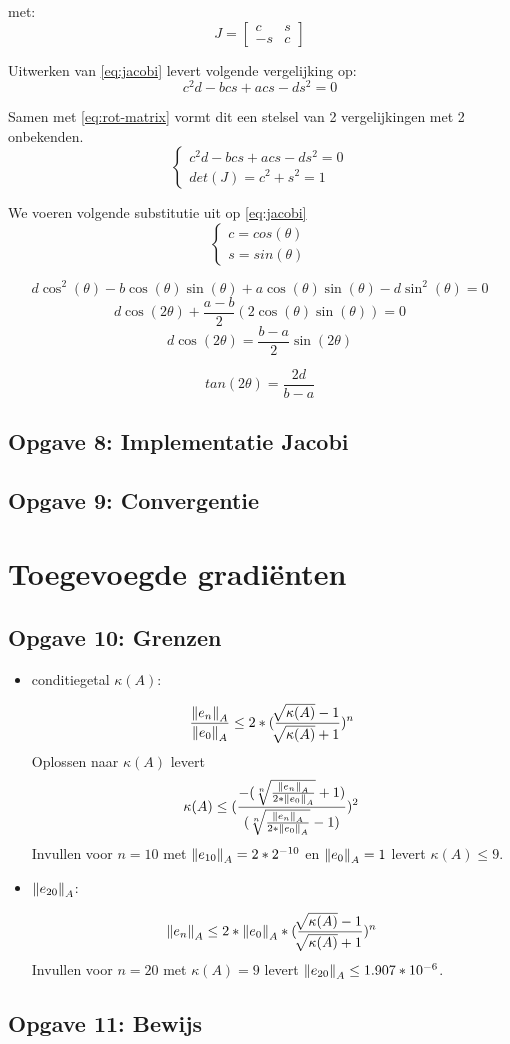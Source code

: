 \documentclass[a4paper]{article}
\newcommand{\opgave}[1]{\subsection{Opgave #1}}
\begin{document}
met: $$J = \begin{bmatrix}
c & s \\ -s & c
\end{bmatrix}$$

Uitwerken van \ref{eq:jacobi} levert volgende vergelijking op:
\begin{equation}
c^2d-bcs+acs-ds^2 = 0
\end{equation}

Samen met \ref{eq:rot-matrix} vormt dit een stelsel van 2 vergelijkingen met 2 onbekenden.
$$\begin{cases}
c^2d-bcs+acs-ds^2 = 0 \\ det(J) = c^2 + s^2 = 1
\end{cases}$$

We voeren volgende substitutie uit op \ref{eq:jacobi}
\begin{equation}
\begin{cases}
c = cos(\theta) \\ s = sin(\theta)
\end{cases}
\end{equation}

$$ d \cos^2(\theta) - b \cos(\theta) \sin(\theta) + a \cos(\theta) \sin(\theta) - d \sin^2(\theta) = 0$$
$$ d \cos(2\theta) + \frac{a-b}{2}(2 \cos(\theta)\sin(\theta)) = 0 $$
$$ d \cos(2\theta) = \frac{b-a}{2}\sin(2\theta)$$

\begin{equation}
tan(2\theta) = \frac{2d}{b-a}
\end{equation}

\opgave{8: Implementatie Jacobi}\label{sec:oef8}

\opgave{9: Convergentie}\label{sec:oef9}

\section{Toegevoegde gradi\"enten}\label{sec:CG}

\opgave{10: Grenzen}\label{sec:oef10}

\begin{itemize}
    	\item conditiegetal \(\kappa(A)\): \par\noindent
        \[\frac{\norm{e_n}_A}{\norm{e_0}_A} \leq 2*(\frac{\sqrt[]{\kappa(A)}-1}{\sqrt[]					{\kappa(A)}+1})^n\]
        Oplossen naar \(\kappa(A)\) levert
        \[\kappa(A) \leq (\frac{-(\sqrt[n]{\frac{\norm{e_n}_A}{2*\norm{e_0}_A}}+1)}						{(\sqrt[n]{\frac{\norm{e_n}_A}{2*\norm{e_0}_A}}-1)})^2\]
        Invullen voor \(n = 10\) met \(\norm{e_{10}}_A = 2*2^{-10}\) en \(\norm{e_0}_A = 1\) 			levert \(\kappa(A) \leq 9\).
        
        \item \(\norm{e_{20}}_A\): \par\noindent
        \[\norm{e_n}_A \leq 2*\norm{e_0}_A*(\frac{\sqrt[]{\kappa(A)}-1}{\sqrt[]							{\kappa(A)}+1})^n\]
        Invullen voor \(n = 20\) met \(\kappa(A) = 9\) levert \(\norm{e_{20}}_A \leq 					1.907*10^{-6}\).
	\end{itemize}

\opgave{11: Bewijs}\label{sec:oef11}
\end{document}
